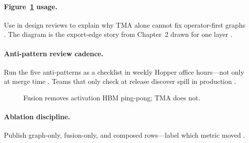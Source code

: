 \paragraph{Figure~\ref{fig:fusion_hbm_compare} usage.}
Use in design reviews to explain why TMA alone cannot fix operator-first graphs \citep{semianalysis2024tma,memoryfloor2026,taxbreak2026}.
The diagram is the export-edge story from Chapter~2 drawn for one layer \citep{chen2020compilerbasedhardw,dao2022flashattention}.

\paragraph{Anti-pattern review cadence.}
Run the five anti-patterns as a checklist in weekly Hopper office hours---not only at merge time \citep{patel2025llminference,memoryfloor2026,taxbreak2026,yirage2026}.
Teams that only check at release discover spill in production \citep{memoryfloor2026,nvidia2022hopper}.

\begin{figure}[t]
\centering
{}
\caption{Fusion removes activation HBM ping-pong; TMA does not.}
\label{fig:fusion_hbm_compare}
\end{figure}

\paragraph{Ablation discipline.}
Publish graph-only, fusion-only, and composed rows---label which metric moved \citep{memoryfloor2026,nvidia2024cudagraphs,taxbreak2026}.

